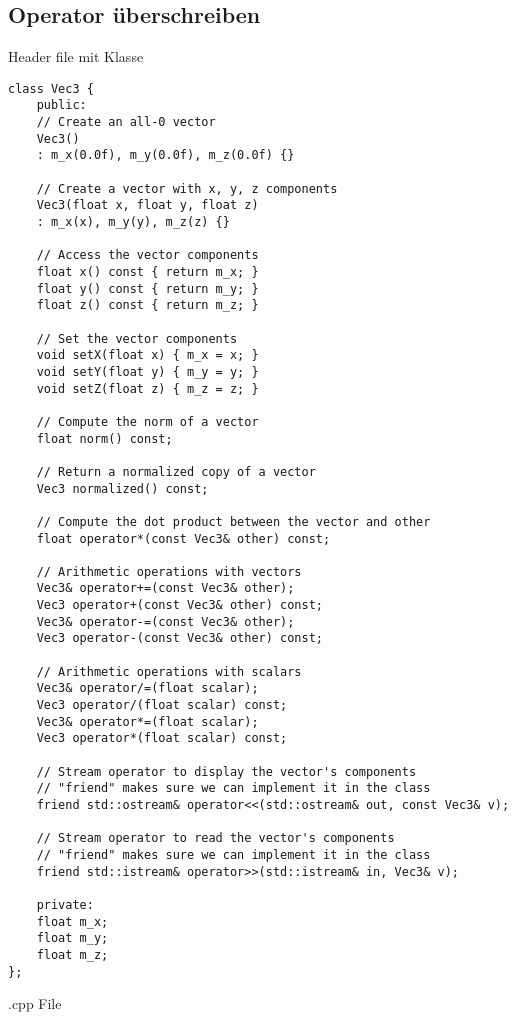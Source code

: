 \subsection{Operator überschreiben}
Header file mit Klasse
\begin{lstlisting}
class Vec3 {
	public:
	// Create an all-0 vector
	Vec3() 
	: m_x(0.0f), m_y(0.0f), m_z(0.0f) {}
	
	// Create a vector with x, y, z components
	Vec3(float x, float y, float z) 
	: m_x(x), m_y(y), m_z(z) {}
	
	// Access the vector components  
	float x() const { return m_x; }
	float y() const { return m_y; }
	float z() const { return m_z; }
	
	// Set the vector components
	void setX(float x) { m_x = x; }
	void setY(float y) { m_y = y; }
	void setZ(float z) { m_z = z; }
	
	// Compute the norm of a vector
	float norm() const;
	
	// Return a normalized copy of a vector
	Vec3 normalized() const;
	
	// Compute the dot product between the vector and other
	float operator*(const Vec3& other) const;
	
	// Arithmetic operations with vectors
	Vec3& operator+=(const Vec3& other);
	Vec3 operator+(const Vec3& other) const;
	Vec3& operator-=(const Vec3& other);
	Vec3 operator-(const Vec3& other) const;
	
	// Arithmetic operations with scalars
	Vec3& operator/=(float scalar);
	Vec3 operator/(float scalar) const;
	Vec3& operator*=(float scalar);
	Vec3 operator*(float scalar) const;
	
	// Stream operator to display the vector's components
	// "friend" makes sure we can implement it in the class
	friend std::ostream& operator<<(std::ostream& out, const Vec3& v);
	
	// Stream operator to read the vector's components
	// "friend" makes sure we can implement it in the class
	friend std::istream& operator>>(std::istream& in, Vec3& v);
	
	private:
	float m_x;
	float m_y;
	float m_z;
};
\end{lstlisting}
.cpp File
